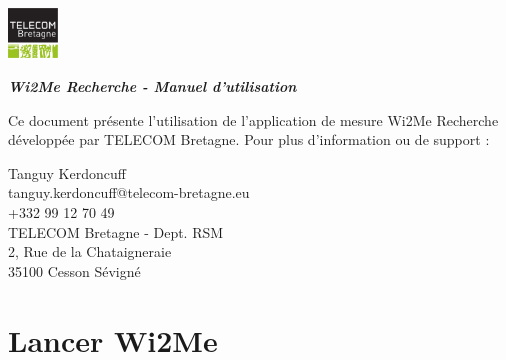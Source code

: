 \documentclass[11pt]{article}
\newcommand\mtext[2]{#1}
\newcommand\mtext[2]{#2}
\begin{document}


\begin{flushright}
  \includegraphics[width=0.1\textwidth]{bretagne_quadri.pdf}
\end{flushright}

\begin{center}
\Huge{\bf \emph{\mtext{Wi2Me Recherche - Manuel d'utilisation}{Wi2Me Research - User Manual}}} %
\end{center}

\begin{flushleft}
\mtext{Ce document présente l'utilisation de l'application de mesure Wi2Me Recherche développée par TELECOM Bretagne. Pour plus d'information ou de support :}{This Document presents the steps required to perform mesurements using the Wi2Me Research application developed by TELECOM Bretagne. For more information or support, feel free to contact : }

Tanguy Kerdoncuff \\ 
tanguy.kerdoncuff@telecom-bretagne.eu\\
+332 99 12 70 49 \\
TELECOM Bretagne - Dept. RSM\\
2, Rue de la Chataigneraie \\
35100 Cesson Sévigné\\
\end{flushleft}

\section{\mtext{Lancer Wi2Me}{Starting Wi2Me}}\label{starting}
\end{document}
